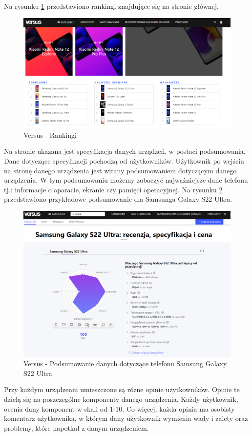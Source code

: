 Na rysunku \ref*{versus_1} przedstawiono rankingi znajdujące się na stronie głównej.
\begin{figure}[H]
    \centering
    \includegraphics[scale=0.45]{img/versus/versusRankingi.png}
    \caption{Versus - Rankingi}
    \label{versus_1}
\end{figure}
Na stronie ukazana jest specyfikacja danych urządzeń, w postaci podsumowania. Dane dotyczące specyfikacji pochodzą od użytkowników. Użytkownik po wejściu na stronę danego urządzenia jest witany podsumowaniem dotyczącym danego urządzenia. W tym podsumowaniu możemy zobaczyć najważniejsze dane telefonu tj.: informacje o aparacie, ekranie czy pamięci operacyjnej.
\newpage
Na rysunku \ref*{versus_2} przedstawiono przykładowe podsumowanie dla Samsunga Galaxy S22 Ultra.
\begin{figure}[h]
    \centering
    \includegraphics[scale=0.46]{img/versus/versusDetails.png}
    \caption{Versus - Podsumowanie danych dotyczące telefonu Samsung Galaxy S22 Ultra}
    \label{versus_2}
\end{figure}
Przy każdym urządzeniu umieszczone są różne opinie użytkowników. Opinie te dzielą się na poszczególne komponenty danego urządzenia. Każdy użytkownik, ocenia dany komponent w skali od 1-10. Co więcej, każda opinia ma osobisty komentarz użytkownika, w którym dany użytkownik wymienia wady i zalety oraz problemy, które napotkał z danym urządzeniem.

